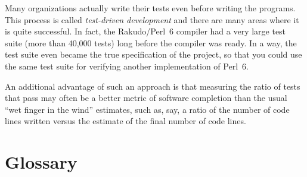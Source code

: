 Many organizations actually write their tests even before 
writing the programs. This process is called 
\emph{test-driven development} and there are many areas where 
it is quite successful. In fact, the Rakudo/Perl~6 compiler 
had a very large test suite (more than 40,000 tests) long 
before the compiler was ready. In a way, the test suite 
even became the true specification of the project, so that 
you could use the same test suite for verifying another 
implementation of Perl~6.

An additional advantage of 
such an approach is that measuring the ratio of tests that 
pass may often be a better metric of software completion than  
the usual ``wet finger in the wind'' estimates, such as, say, 
a ratio of the number of code lines written versus the estimate 
of the final number of code lines.

\section{Glossary}

